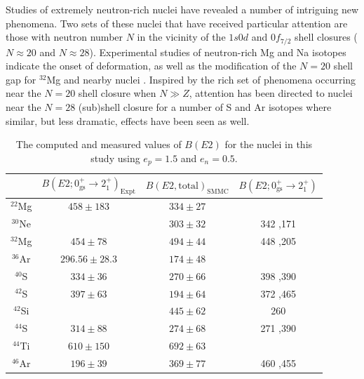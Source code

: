 Studies of extremely neutron-rich nuclei have revealed a number of
intriguing new phenomena.  Two sets of these nuclei that have received
particular attention are those with neutron number $N$ in the vicinity
of the $1s0d$ and $0f_{7/2}$ shell closures ($N \approx 20$ and $N
\approx 28$).  Experimental studies of neutron-rich Mg and Na isotopes
indicate the onset of deformation, as well as the modification of the
$N = 20$ shell gap for $^{32}$Mg and nearby nuclei \cite{Morten:r:motobayashi}.
Inspired by the rich set of phenomena occurring near the $N = 20$
shell closure when $N \gg Z$, attention has been directed to nuclei
near the $N = 28$ (sub)shell closure for a number of S and Ar isotopes
\cite{Morten:r:brown1,Morten:r:brown2} where similar, but less dramatic, 
effects have been seen as well.
\renewcommand{\arraystretch}{1.2}
\begin{table}%
\begin{center}
\caption{The computed and measured values of $B(E2)$ for
the nuclei in this study using $e_p=1.5$ and $e_n=0.5$.
}
\begin{tabular}{|cccc|}\hline
 & $B(E2; 0^+_{\mathrm{gs}} \rightarrow 2^+_1)_{\mathrm{Expt}}$ 
& $B(E2, \mathrm{total})_{\mathrm{SMMC}}$ &
  $B(E2; 0^+_{\mathrm{gs}} \rightarrow 2^+_1)$  \\\hline
 $^{22}$Mg & $458 \pm 183$ & $334 \pm 27 $
    & \\
 $^{30}$Ne & & $303 \pm 32$
    & 342 \cite{Morten:r:fukunishi},171 \cite{Morten:r:poves2}  \\
 $^{32}$Mg & $454 \pm 78$ \cite{Morten:r:motobayashi} & $494 \pm 44 $
   & 448 \cite{Morten:r:fukunishi},205 \cite{Morten:r:poves2} \\
 $^{36}$Ar & $296.56 \pm 28.3$ \cite{Morten:r:ensdf} & $174 \pm 48$
    & \\
 $^{40}$S & $334 \pm 36$ \cite{Morten:r:brown1} & $270 \pm 66$
    & 398 \cite{Morten:r:brown2},390 \cite{Morten:r:retamosa}  \\
 $^{42}$S & $397 \pm 63$ \cite{Morten:r:brown1} & $194 \pm 64$
   & 372 \cite{Morten:r:brown2},465 \cite{Morten:r:retamosa}  \\
 $^{42}$Si &  &  $445 \pm 62$
    & 260 \cite{Morten:r:retamosa}  \\
 $^{44}$S & $314 \pm 88$ \cite{Morten:r:brown2} & $274 \pm 68$
    & 271 \cite{Morten:r:brown2},390 \cite{Morten:r:retamosa}  \\
 $^{44}$Ti & $610 \pm 150$ \cite{Morten:r:raman} & $692 \pm 63$
    &  \\
 $^{46}$Ar & $196 \pm 39$ \cite{Morten:r:brown1} & $369 \pm 77 $
    & 460 \cite{Morten:r:brown1},455 \cite{Morten:r:retamosa}  \\\hline
\end{tabular}
\end{center}
\label{Morten:t:tab1}
\end{table}
